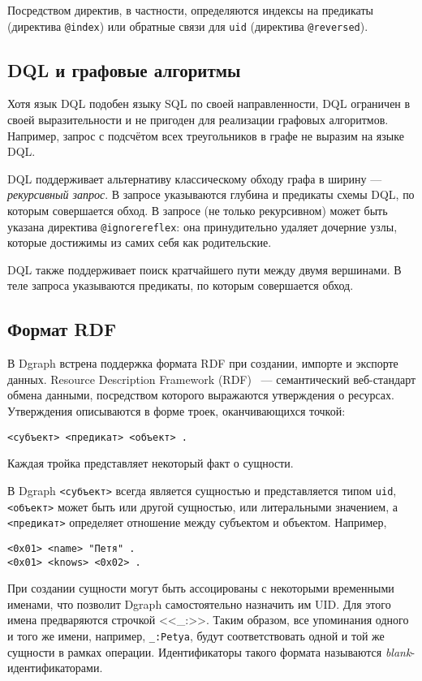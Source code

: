 Посредством директив, в частности, определяются индексы на предикаты (директива \texttt{@index})
или обратные связи для \texttt{uid} (директива \texttt{@reversed}).

\subsection{DQL и графовые алгоритмы}

Хотя язык DQL подобен языку SQL по своей направленности, DQL ограничен в своей выразительности и
не пригоден для реализации графовых алгоритмов. Например, запрос с подсчётом всех треугольников в
графе не выразим на языке DQL.

DQL поддерживает альтернативу классическому обходу графа в ширину --- \textit{рекурсивный запрос}.
В запросе указываются глубина и предикаты схемы DQL, по которым совершается обход. В запросе
(не только рекурсивном) может быть указана директива \texttt{@ignorereflex}: она принудительно
удаляет дочерние узлы, которые достижимы из самих себя как родительские.

DQL также поддерживает поиск кратчайшего пути между двумя вершинами. В теле запроса указываются
предикаты, по которым совершается обход.

\subsection{Формат RDF}

В Dgraph встрена поддержка формата RDF при создании, импорте и экспорте данных. Resource Description
Framework (RDF)~\cite{rdf} --- семантический веб-стандарт обмена данными, посредством которого
выражаются утверждения о ресурсах. Утверждения описываются в форме троек, оканчивающихся точкой:
\begin{Verbatim}
<субъект> <предикат> <объект> .
\end{Verbatim}
Каждая тройка представляет некоторый факт о сущности.

В Dgraph \texttt{<субъект>} всегда является сущностью и представляется типом \texttt{uid},
\texttt{<объект>} может быть или другой сущностью, или литеральными значением, а
\texttt{<предикат>} определяет отношение между субъектом и объектом. Например,
\begin{Verbatim}
<0x01> <name> "Петя" .
<0x01> <knows> <0x02> .
\end{Verbatim}

При создании сущности могут быть ассоцированы с некоторыми временными именами, что позволит Dgraph
самостоятельно назначить им UID. Для этого имена предваряются строчкой <<\_:>>. Таким образом,
все упоминания одного и того же имени, например, \texttt{\_:Petya}, будут соответствовать одной и
той же сущности в рамках операции. Идентификаторы такого формата называются \textit{blank}-идентификаторами.

